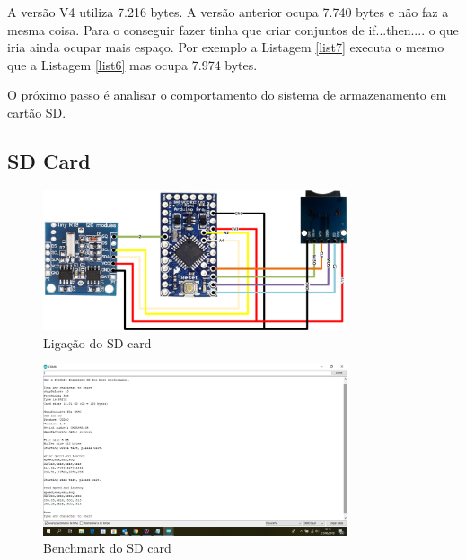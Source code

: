 \documentclass{article}
\begin{document}
A versão V4 utiliza 7.216 bytes. A versão anterior ocupa 7.740 bytes e não faz a mesma coisa. Para o conseguir fazer tinha que criar conjuntos de if...then.... o que iria ainda ocupar mais espaço. Por exemplo a Listagem \ref{list7} executa o mesmo que a Listagem \ref{list6} mas ocupa 7.974 bytes.



O próximo passo é analisar o comportamento do sistema de armazenamento em cartão SD.

\subsection{SD Card}

\begin{figure}[htb!]
\centering
\includegraphics[width=0.8\textwidth]{Figuras/Fig26.png}
\caption{Ligação do SD card}
\label{fig:fig15}
\end{figure}

\begin{figure}[htb!]
\centering
\includegraphics[width=0.8\textwidth]{Figuras/Fig27.png}
\caption{Benchmark do SD card}
\label{fig:fig15}
\end{figure}
\end{document}
